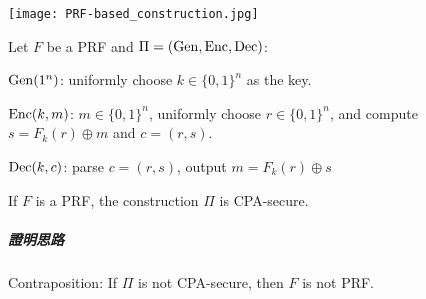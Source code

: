 \begin{center}
	\texttt{[image: PRF-based\_construction.jpg]}
\end{center}

Let \(F\) be a PRF and \(\Pi = (\operatorname{Gen}, \operatorname{Enc}, \operatorname{Dec})\):
\begin{myItemize}
	\item \(\operatorname{Gen}(1^n)\): uniformly choose \(k \in \{0, 1\}^n\) as the key.
	\item \(\operatorname{Enc}(k, m)\): \(m \in \{0, 1\}^n\), uniformly choose \(r \in \{0, 1\}^n\), and compute \(s = F_k(r) \oplus m\) and \(c = (r, s)\).
	\item \(\operatorname{Dec}(k, c)\): parse \(c = (r, s)\), output \(m = F_k(r) \oplus s\)
\end{myItemize}

\begin{theorem}
	If \(F\) is a PRF, the construction \(\Pi\) is CPA-secure.
\end{theorem}

\subparagraph{證明思路}

Contraposition: If \(\Pi\) is not CPA-secure, then \(F\) is not PRF.

